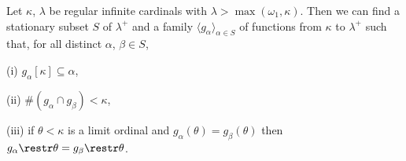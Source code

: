  Let $\kappa$, $\lambda$ be regular infinite
cardinals with $\lambda>\max(\omega_1,\kappa)$.
Then we can find a stationary subset $S$ of $\lambda^+$ and a family
$\langle g_{\alpha}\rangle_{\alpha\in S}$ of functions
from $\kappa$ to $\lambda^+$ such that, for all distinct $\alpha$,
$\beta\in S$,

(i) $g_{\alpha}[\kappa]\subseteq\alpha$,

(ii) $\#(g_{\alpha}\cap g_{\beta})<\kappa$,

(iii) if $\theta<\kappa$ is a limit ordinal and
$g_{\alpha}(\theta)=g_{\beta}(\theta)$ then
$g_{\alpha}\restr\theta=g_{\beta}\restr\theta$.







\discrpage

